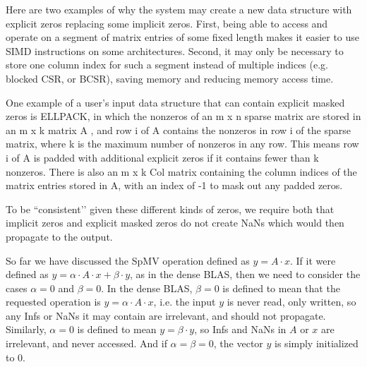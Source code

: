 \documentclass{article}
\begin{document}
Here are two examples of why the system may create a new data structure with
explicit zeros replacing some implicit zeros. First, being able to access and
operate on a segment of matrix entries of some fixed length makes it easier to
use SIMD instructions on some architectures. Second, it may only be necessary
to store one column index for such a segment instead of multiple indices
(e.g. blocked CSR, or BCSR), saving memory and reducing memory access time.

One example of a user’s input data structure that can contain explicit masked zeros is ELLPACK, 
in which the nonzeros of an m x n sparse matrix are stored in an m x k matrix A , and row i of A
contains the nonzeros in row i of the sparse matrix, where k is the maximum number of 
nonzeros in any row. This means row i of A is padded with additional explicit zeros if it contains
fewer than k nonzeros. There is also an m x k Col matrix containing the column indices of the
matrix entries stored in A, with an index of -1 to mask out any padded zeros.

\iffalse
Another example of explicit masked zeros is the BCSR format described above, augmented
with a bit-mask for each segment to indicate which zeros are implicit zeros, and so should 
not participate in any arithmetic operation (or if they do, that no NaNs are propagated).
Such a data structure could either be the user’s input data structure, or created as a
performance optimization by the system.
\todo[inline]{[Spencer] Are we sure we want to use BCSR format augmented with a bitmask as an example here.  It is non standard and we discussed BSR or BCSR format being one where explicit zeros are actually added (modeling case 2).}

\todo[inline]{[Jim D.] I am open to
suggestions of other examples.}
\fi

To be ``consistent’’ given these different kinds of zeros, we require both that
implicit zeros and explicit masked zeros do not create NaNs which would then
propagate to the output. 

So far we have discussed the SpMV operation defined as $y=A \cdot x$. 
If it were defined as $y = \alpha \cdot A \cdot x + \beta \cdot y$, as in the dense BLAS,
then we need to consider the cases $\alpha = 0$ and $\beta = 0$. In the dense BLAS,
$\beta = 0$ is defined to mean that the requested operation is $y = \alpha \cdot A \cdot x$,
i.e. the input $y$ is never read, only written, so any Infs or NaNs it may contain are
irrelevant, and should not propagate. Similarly, $\alpha = 0$ is defined to mean
$y = \beta \cdot y$, so Infs and NaNs in $A$ or $x$ are irrelevant, and never accessed.
And if $\alpha = \beta = 0$, the vector $y$ is simply initialized to 0.
\end{document}
